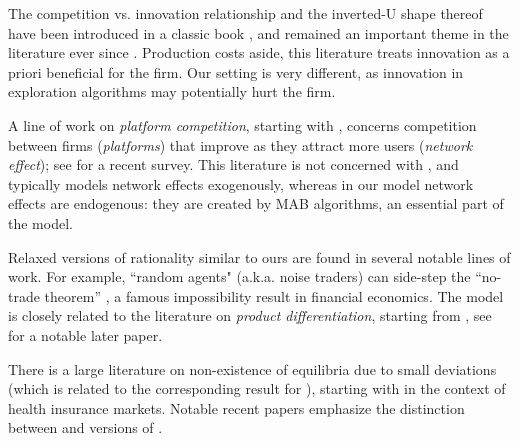  The competition vs. innovation relationship and the inverted-U shape thereof have been introduced in a classic book \citep{Schumpeter-42}, and remained an important theme in the literature ever since \cite[\eg][]{Aghion-QJE05,Vives-08}. Production costs aside, this literature treats innovation as a priori beneficial for the firm. Our setting is very different, as innovation in exploration algorithms may potentially hurt the firm.

A line of work on \emph{platform competition}, starting with \cite{Rysman09}, concerns competition between firms (\emph{platforms}) that improve as they attract more users (\emph{network effect}); see \citet{Weyl-White-14} for a recent survey. This literature is not concerned with \innovation, and typically models network effects exogenously, whereas in our model network effects are endogenous: they are created by MAB algorithms, an essential part of the model.

Relaxed versions of rationality similar to ours are found in several notable lines of work. For example, ``random agents" (a.k.a. noise traders) can side-step the ``no-trade theorem'' \citep{Milgrom-Stokey-82}, a famous impossibility result in financial economics. The \SoftMaxRandom model is closely related to the literature on \emph{product differentiation}, starting from \cite{Hotelling-29}, see \cite{Perloff-Salop-85} for a notable later paper.

There is a large literature on non-existence of equilibria due to small deviations   (which is related to the corresponding result for \HardMaxRandom), starting with \cite{Rothschild-Stiglitz-76} in the context of health insurance markets. Notable recent papers \citep{Veiga-Weyl-16,Azevedo-Gottlieb-17} emphasize the distinction between \HardMax and versions of \SoftMaxRandom.






